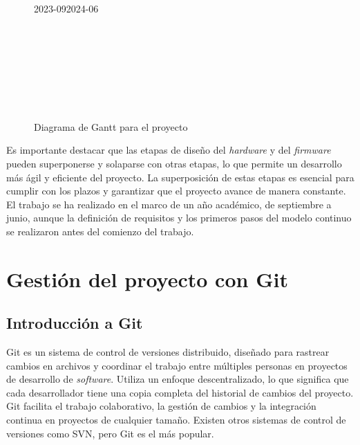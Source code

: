 \begin{landscape}
	\begin{figure}[H]
		\centering
		\begin{ganttchart}[
			hgrid,
			vgrid,
			y unit chart=0.7cm,
			x unit=1.5cm,
			time slot format=isodate-yearmonth,
			time slot unit=month,
			bar/.append style={fill=blue!30},
			bar label font=\footnotesize,
			group label font=\footnotesize,
    		newline shortcut=true,
			]{2023-09}{2024-06}
			 \\ %
			 \\
			 \\
			 \\
			 \\
			 \\
			 \\
			 \\
			
			\end{ganttchart}
			\caption{Diagrama de Gantt para el proyecto}	
	\end{figure}
\end{landscape}
	
\newpage

Es importante destacar que las etapas de diseño del \textit{hardware} y del \textit{firmware} pueden superponerse y solaparse con otras etapas, lo que permite un desarrollo más ágil y eficiente del proyecto. La superposición de estas etapas es esencial para cumplir con los plazos y garantizar que el proyecto avance de manera constante. El trabajo se ha realizado en el marco de un año académico, de septiembre a junio, aunque la definición de requisitos y los primeros pasos del modelo continuo se realizaron antes del comienzo del trabajo.

\section{Gestión del proyecto con Git}
\subsection{Introducción a Git}
Git es un sistema de control de versiones distribuido, diseñado para rastrear cambios en archivos y coordinar el trabajo entre múltiples personas en proyectos de desarrollo de \textit{software}. Utiliza un enfoque descentralizado, lo que significa que cada desarrollador tiene una copia completa del historial de cambios del proyecto. Git facilita el trabajo colaborativo, la gestión de cambios y la integración continua en proyectos de cualquier tamaño. Existen otros sistemas de control de versiones como SVN, pero Git es el más popular.


